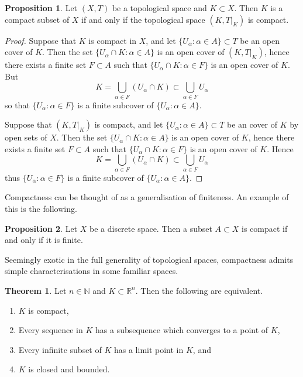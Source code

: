 \documentclass{book}
\theoremstyle{definition}
\newtheorem{theorem}{Theorem}[section]
\newtheorem{proposition}{Proposition}[section]
\theoremstyle{remark}
\newcommand{\R}{\mathbb{R}}
\newcommand{\N}{\mathbb{N}}
\begin{document}
\begin{proposition}
\label{compactnessnotrelative}
Let $(X, T)$ be a topological space and $K\subset X$. Then $K$ is a compact subset of $X$ if and only if the topological space $(K, T|_K)$ is compact.
\end{proposition}
\begin{proof}
Suppose that $K$ is compact in $X$, and let $\{U_\alpha:\alpha\in A\}\subset T$ be an open cover of $K$. Then the set $\{U_\alpha\cap K:\alpha\in A\}$ is an open cover of $(K, T|_K)$, hence there exists a finite set $F\subset A$ such that $\{U_\alpha\cap K:\alpha\in F\}$ is an open cover of $K$. But
$$K=\bigcup_{\alpha\in F}(U_\alpha\cap K)\subset\bigcup_{\alpha\in F}U_\alpha$$
so that $\{U_\alpha:\alpha\in F\}$ is a finite subcover of $\{U_\alpha:\alpha\in A\}$.

Suppose that $(K, T|_K)$ is compact, and let $\{U_\alpha:\alpha\in A\}\subset T$ be an cover of $K$ by open sets of $X$. Then the set $\{U_\alpha\cap K:\alpha\in A\}$ is an open cover of $K$, hence there exists a finite set $F\subset A$ such that $\{U_\alpha\cap K:\alpha\in F\}$ is an open cover of $K$. Hence
$$K=\bigcup_{\alpha\in F} (U_\alpha\cap K)\subset\bigcup_{\alpha\in F}U_\alpha$$
thus $\{U_\alpha:\alpha\in F\}$ is a finite subcover of $\{U_\alpha:\alpha\in A\}$.
\end{proof}

Compactness can be thought of as a generalisation of finiteness. An example of this is the following.
\begin{proposition}
Let $X$ be a discrete space. Then a subset $A\subset X$ is compact if and only if it is finite.
\end{proposition}

Seemingly exotic in the full generality of topological spaces, compactness admits simple characterisations in some familiar spaces.

\begin{theorem}
\label{compactRn}
Let $n\in\N$ and $K\subset\R^n$. Then the following are equivalent.
\begin{enumerate}
    \item $K$ is compact,
    \item Every sequence in $K$ has a subsequence which converges to a point of $K$,
    \item Every infinite subset of $K$ has a limit point in $K$, and
    \item $K$ is closed and bounded.
\end{enumerate}
\end{theorem}
\end{document}
